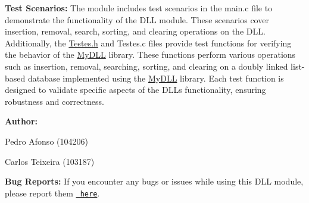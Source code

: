 {\bfseries{Test Scenarios\+:}} The module includes test scenarios in the main.\+c file to demonstrate the functionality of the DLL module. These scenarios cover insertion, removal, search, sorting, and clearing operations on the DLL. Additionally, the \mbox{\hyperlink{Testes_8h}{Testes.\+h}} and Testes.\+c files provide test functions for verifying the behavior of the \mbox{\hyperlink{structMyDLL}{My\+DLL}} library. These functions perform various operations such as insertion, removal, searching, sorting, and clearing on a doubly linked list-\/based database implemented using the \mbox{\hyperlink{structMyDLL}{My\+DLL}} library. Each test function is designed to validate specific aspects of the DLL\textquotesingle{}s functionality, ensuring robustness and correctness.

{\bfseries{Author\+:}}
\begin{DoxyItemize}
\item Pedro Afonso (104206)
\item Carlos Teixeira (103187)
\end{DoxyItemize}

{\bfseries{Bug Reports\+:}} If you encounter any bugs or issues while using this DLL module, please report them \href{https://github.com/pisko19/SETR/issues}{\texttt{ here}}. 